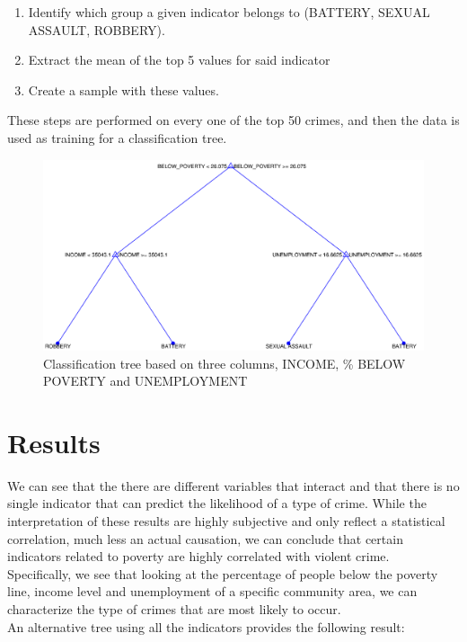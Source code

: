\documentclass[a4paper,10pt]{article}
\begin{document}
\begin{enumerate}
	\item Identify which group a given indicator belongs to (BATTERY, SEXUAL ASSAULT, ROBBERY).
	\item Extract the mean of the top 5 values for said indicator
	\item Create a sample with these values.
\end{enumerate}

These steps are performed on every one of the top 50 crimes, and then the data is used as training for a classification tree.

\begin{figure}[H]
	\includegraphics[width=\linewidth]{media/tree.eps}
	\caption{Classification tree based on three columns, INCOME, \% BELOW POVERTY and UNEMPLOYMENT}
\end{figure}

\section{Results}

We can see that the there are different variables that interact and that there is no single indicator that can predict the likelihood of a type of crime. While the interpretation of these results are highly subjective and only reflect a statistical correlation, much less an actual causation, we can conclude that certain indicators related to poverty are highly correlated with violent crime.\\

Specifically, we see that looking at the percentage of people below the poverty line, income level and unemployment of a specific community area, we can characterize the type of crimes that are most likely to occur.\\

An alternative tree using all the indicators provides the following result:
\end{document}
